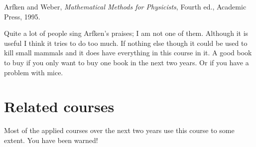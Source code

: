 \documentclass{notes}
\theoremstyle{plain}
\begin{document}
\backmatter

\begin{thebibliography}{9}

 Arfken and Weber, \emph{Mathematical Methods for
    Physicists}, Fourth ed., Academic Press, 1995.
  
  {\sffamily \small Quite a lot of people sing Arfken's praises; I am
    not one of them.  Although it is useful I think it tries to do too
    much.  If nothing else though it could be used to kill small
    mammals and it does have everything in this course in it.  A good
    book to buy if you only want to buy one book in the next two
    years.  Or if you have a problem with mice. }
 
\end{thebibliography}

\section*{Related courses}

Most of the applied courses over the next two years use this course to
some extent.  You have been warned!
\end{document}
